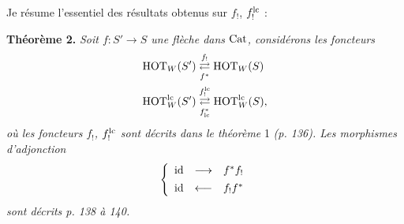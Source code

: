 Je résume l'essentiel des résultats obtenus sur $f_!$, $f_!^{\lc}$ :

\textbf{Théorème 2.} \textit{Soit $f : S' \longrightarrow S$ une flèche dans} $\Cat$\textit{, considérons les foncteurs}
\[
\begin{aligned}
\HOT_W(S') &\adj{f_!}{f^*} \HOT_W(S) \\
\HOT^{\lc}_W(S') &\adj{f_!^{\lc}}{f^*_{\lc}} \HOT^{\lc}_W(S),
\end{aligned}
\]
\textit{où les foncteurs $f_!$, $f_!^{\lc}$ sont décrits dans le théorème} 1 \textit{(p. 136). Les morphismes d'adjonction}
\[
\left\{
\begin{array}{lcl}
\id & \longrightarrow & f^*f_! \\[1ex]
\id & \longleftarrow & f_!f^*
\end{array}
\right.
\]
\textit{sont décrits p. 138 à 140.}

